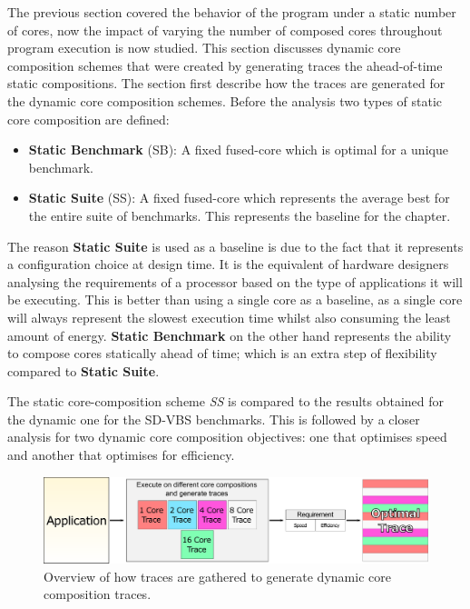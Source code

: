 The previous section covered the behavior of the program under a static number of cores, now the impact of varying the number of composed cores throughout program execution is now studied.
This section discusses dynamic core composition schemes that were created by generating traces the ahead-of-time static compositions.
The section first describe how the traces are generated for the dynamic core composition schemes.
Before the analysis two types of static core composition are defined:

\begin{itemize}
	\item \textbf{Static Benchmark} (SB): A fixed fused-core which is optimal for a unique benchmark.
\vspace{-1.2em}
	\item \textbf{Static Suite} (SS): A fixed fused-core which represents the average best for the entire suite of benchmarks. This represents the baseline for the chapter.
\end{itemize}

The reason \textbf{Static Suite} is used as a baseline is due to the fact that it represents a configuration choice at design time.
It is the equivalent of hardware designers analysing the requirements of a processor based on the type of applications it will be executing.
This is better than using a single core as a baseline, as a single core will always represent the slowest execution time whilst also consuming the least amount of energy.
\textbf{Static Benchmark} on the other hand represents the ability to compose cores statically ahead of time; which is an extra step of flexibility compared to \textbf{Static Suite}.

The static core-composition scheme \textit{SS} is compared to the results obtained for the dynamic one for the SD-VBS benchmarks.
This is followed by a closer analysis for two dynamic core composition objectives: one that optimises speed and another that optimises for efficiency.

\begin{figure}[t]
    \centering
	\includegraphics[width=1\textwidth]{cases-paper/graphics/exploration/trace-gathering.pdf}
    \caption{Overview of how traces are gathered to generate dynamic core composition traces.}
    \label{fig:tracegraph}
	\vspace{1em}
\end{figure}

